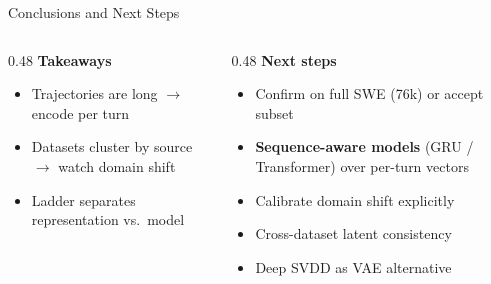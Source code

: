 \documentclass{beamer}
\begin{document}
\begin{frame}{Conclusions and Next Steps}

\begin{columns}[T]
\begin{column}{0.48\textwidth}
\textbf{Takeaways}
\begin{itemize}\setlength\itemsep{4pt}
  \item Trajectories are long $\to$ encode per turn
  \item Datasets cluster by source $\to$ watch domain shift
  \item Ladder separates representation vs.\ model
\end{itemize}
\end{column}

\begin{column}{0.48\textwidth}
\textbf{Next steps}
\begin{itemize}\setlength\itemsep{4pt}
  \item Confirm on full SWE (76k) or accept subset
  \item \textbf{Sequence-aware models} (GRU / Transformer) over per-turn vectors
  \item Calibrate domain shift explicitly
  \item Cross-dataset latent consistency
  \item Deep SVDD as VAE alternative
\end{itemize}
\end{column}
\end{columns}

\end{frame}
\end{document}
